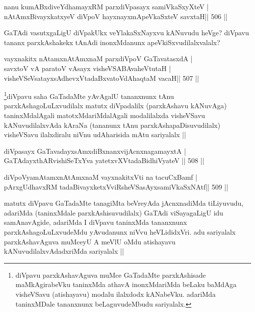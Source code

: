\begin{shl}
nanu kumABxdiveYdhamayxRM parxdiVpasayx samiVkaSxyXteV | \\
nA\s \s tAmxBivayxkatxyeV diVpoV hayxnayxmApeVkaSxteV savxtaH\hfill ||  506 ||  
\end{shl}

\begin{artha}
GaTAdi  vasutxgaLigU diVpakUkx veYlakaSxNayxvu kANuvudu heVge? diVpavu tananx parxkAshakekx tAnAdi inonxMdanunx apeVkiSxvudilalxvalalx? 
\end{artha}


\begin{shl}
vayxnakitx nA\s \s tamxnA\s \s tAmxnaM parxdiVpoV GaTavatasxdA | \\
savxtoV vA paratoV vA\s sayx visheVSABAvaheVtutaH | \\
visheVSeV\s satayxsAdhevxVtadaBxvatoVdAhaqtaM vacaH\hfill ||  507 ||  
\end{shl}

\begin{artha}
\footnote{diVpavu parxkAshavAguva muMce GaTadaMte parxkAshisade maMkAgirabeVku taninxMda athavA inonxMdariMda beLaku baMdAga visheVSavu (atishayavu) modalu ilalxdodx kANabeVku. adariMda taninxMDale tananxnunx beLaguvudeMbudu sariyalalx.}diVpavu saha GaTadaMte yAvAgalU tananxnunx tAnu parxkAshagoLuLxvudilalx matutx diVpadalilx (parxkAshavu kANuvAga) taninxMdalAgali matotxMdariMdalAgali modalilalxda visheVSavu kANuvudilalxvAda kAraNa (tananunx tAnu parxkAshapaDisuvudilalx) visheVSavu ilalxdiralu niVnu udAharisida mAtu sariyalalx ||
\end{artha}

\begin{shl}
diVpasayx GaTavadayxsAmxdiBxnanxvijAcnxnagamayxtA | \\
GaTAdayxthARvishiSeTxYva yatetxvXVtadaBidhiVyateV \hfill||  508 ||  
\end{shl}
				
\begin{shl}
diVpoV\s yamAtamxnA\s \s tAmxnaM vayxnakitxVti na tacuCxBamf | \\
pArxgUdhavxRM tadaBivayxketxVviRsheVSasAyxsamiVkaSxNAtf\hfill ||  509 ||  
\end{shl}

\begin{artha}
matutx diVpavu GaTadaMte tanagiMta beVreyAda jAcnxnadiMda tiLiyuvudu, adariMda (taninxMdale parxkAshisuvudilalx) GaTAdi viSayagaLigU idu samAnavAgide, adariMda I diVpavu taninxMda tananxnunx parxkAshagoLuLxvudeMdu yAvudanunx niVvu heVLididxVri. adu sariyalalx parxkAshavAguva muMceyU A meVlU oMdu atishayavu kANuvudilalxvAdadxriMda sariyalalx ||
\end{artha}

